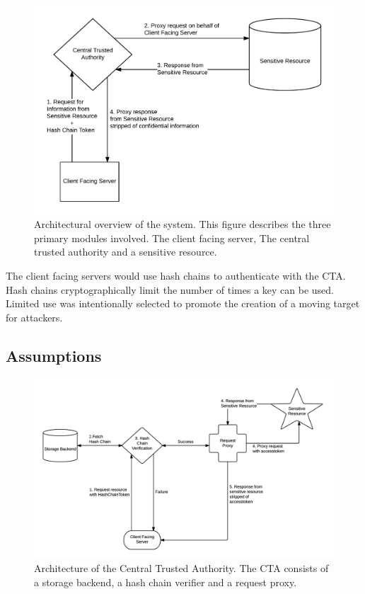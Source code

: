 \documentclass{sig-alternate-05-2015}
\begin{document}
\begin{figure}[ht]
\includegraphics[keepaspectratio=true,scale=0.145]{overview_architecture.png}
\caption{Architectural overview of the system. This figure describes the three primary modules involved. The client facing server, The central trusted authority and a sensitive resource.}
\label{fig:architectureoverview} 
\end{figure}

The client facing servers would use hash chains to authenticate with the CTA. Hash chains cryptographically limit the number of times a key can be used. Limited use was intentionally selected to promote the creation of a moving target for attackers.

\subsection{Assumptions}

\begin{figure}[!ht]
  \centering
  \includegraphics[keepaspectratio=true,scale=0.8]{cta_architecture}
  \caption{Architecture of the Central Trusted Authority. The CTA consists of a storage backend, a hash chain verifier and a request proxy.}
  \label{fig:ctaarchitecture}
\end{figure}
\end{document}
